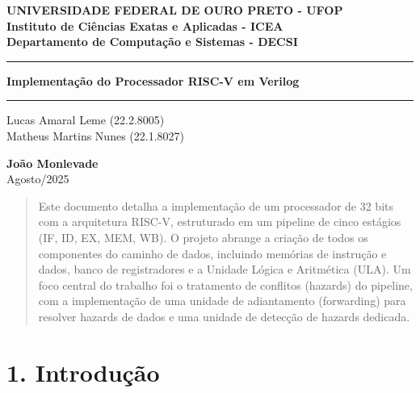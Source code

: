 \documentclass[12pt, a4paper]{article}
\begin{document}
\begin{titlepage}
    \centering
    
    \vspace*{1cm} 
    {\large \textbf{UNIVERSIDADE FEDERAL DE OURO PRETO - UFOP}}\\[0.5cm]
    {\normalsize \textbf{Instituto de Ciências Exatas e Aplicadas - ICEA}}\\[0.2cm]
    {\normalsize \textbf{Departamento de Computação e Sistemas - DECSI}}
    
    \vfill %
    
    \hrule\vspace{0.4cm}
    {\Huge \textbf{Implementação do Processador RISC-V em Verilog}}\\[0.4cm]
    \hrule
    
    \vfill %
    
    \begin{minipage}{0.5\textwidth}
        \centering
        \large Lucas Amaral Leme (22.2.8005)\\[0.3cm]
        \large Matheus Martins Nunes (22.1.8027)
    \end{minipage}
    
    \vfill %
    
    {\large \textbf{João Monlevade}}\\[0.5cm]
    {\large Agosto/2025}
    
\end{titlepage}

\tableofcontents
\newpage

\begin{abstract}
\noindent Este documento detalha a implementação de um processador de 32 bits com a arquitetura RISC-V, estruturado em um pipeline de cinco estágios (IF, ID, EX, MEM, WB). O projeto abrange a criação de todos os componentes do caminho de dados, incluindo memórias de instrução e dados, banco de registradores e a Unidade Lógica e Aritmética (ULA). Um foco central do trabalho foi o tratamento de conflitos (hazards) do pipeline, com a implementação de uma unidade de adiantamento (forwarding) para resolver hazards de dados e uma unidade de detecção de hazards dedicada.
\end{abstract}

\section*{1. Introdução}
\end{document}
